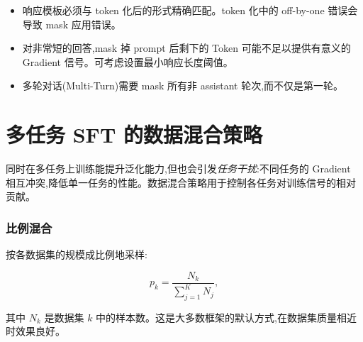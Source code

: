 \begin{warningbox}
\begin{itemize}
  \item 响应模板必须与 token 化后的形式精确匹配。token 化中的 off-by-one 错误会导致 mask 应用错误。
  \item 对非常短的回答,mask 掉 prompt 后剩下的 Token 可能不足以提供有意义的 Gradient 信号。可考虑设置最小响应长度阈值。
  \item 多轮对话(Multi-Turn)需要 mask 所有非 assistant 轮次,而不仅是第一轮。
\end{itemize}
\end{warningbox}

\section{多任务 SFT 的数据混合策略}
\label{sec:data-mixing}

\begin{intuitionbox}[多任务挑战]
同时在多任务上训练能提升泛化能力,但也会引发\emph{任务干扰}:不同任务的 Gradient 相互冲突,降低单一任务的性能。数据混合策略用于控制各任务对训练信号的相对贡献。
\end{intuitionbox}

\subsubsection*{比例混合}
\label{proportional-mixing}

按各数据集的规模成比例地采样:

\[
p_k = \frac{N_k}{\sum_{j=1}^K N_j},
\]

其中 $N_k$ 是数据集 $k$ 中的样本数。这是大多数框架的默认方式,在数据集质量相近时效果良好。

